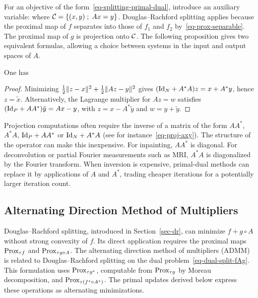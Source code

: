 For an objective of the form~\eqref{eq-splitting-primal-dual}, introduce an auxiliary variable:
where $\mathcal{C}=\left\{ (x,y) \;;\; Ax=y \right\}$. Douglas--Rachford splitting applies because the proximal map of $f$ separates into those of $f_1$ and $f_2$ by~\eqref{eq-prox-separable}. The proximal map of $g$ is projection onto $\mathcal{C}$. The following proposition gives two equivalent formulas, allowing a choice between systems in the input and output spaces of $A$.

\begin{prop}One has
\end{prop}
\begin{proof}
Minimizing $\frac12\lVert z-x\rVert^2+\frac12\lVert Az-y\rVert^2$ gives $(\mathrm{Id}_N+A^*A)z=x+A^*y$, hence $z=\tilde x$. Alternatively, the Lagrange multiplier for $Az=w$ satisfies $(\mathrm{Id}_P+AA^*)\tilde y=Ax-y$, with $z=x-A^*\tilde y$ and $w=y+\tilde y$.
\end{proof}

\begin{rem}\label{rem-inv-lin}
	Projection computations often require the inverse of a matrix of the form
	$AA^*$, $A^*A$, $\mathrm{Id}_P+AA^*$ or $\mathrm{Id}_N+A^*A$ (see for instance~\eqref{eq-proj-axy}).
	The structure of the operator can make this inexpensive.
	For inpainting, $AA^*$ is diagonal. For deconvolution or partial Fourier measurements such as MRI, $A^*A$ is diagonalized by the Fourier transform.
	When inversion is expensive, primal-dual methods can replace it by applications of $A$ and $A^*$, trading cheaper iterations for a potentially larger iteration count.
\end{rem}


\subsection{Alternating Direction Method of Multipliers}

Douglas--Rachford splitting, introduced in Section~\ref{sec-dr}, can minimize $f+g\circ A$ without strong convexity of $f$. Its direct application requires the proximal maps $\operatorname{Prox}_{\tau f}$ and $\operatorname{Prox}_{\tau g\circ A}$.
%
The alternating direction method of multipliers (ADMM) is related to Douglas--Rachford splitting on the dual problem~\eqref{eq-dual-split-fAg}. This formulation uses $\operatorname{Prox}_{\tau g^*}$, computable from $\operatorname{Prox}_{\tau g}$ by Moreau decomposition, and $\operatorname{Prox}_{\tau(f^*\circ A^*)}$. The primal updates derived below express these operations as alternating minimizations.

